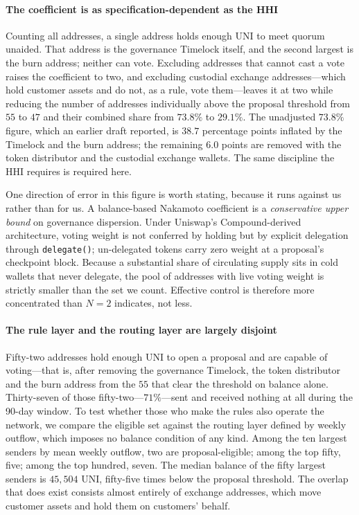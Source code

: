 \documentclass[final,5p,times]{elsarticle}
\begin{document}
\paragraph{The coefficient is as specification-dependent as the HHI}
Counting all addresses, a single address holds enough UNI to meet quorum
unaided. That address is the governance Timelock itself, and the second
largest is the burn address; neither can vote. Excluding addresses that
cannot cast a vote raises the coefficient to two, and excluding custodial
exchange addresses---which hold customer assets and do not, as a rule, vote
them---leaves it at two while reducing the number of addresses individually
above the proposal threshold from $55$ to $47$ and their combined share from
$73.8\%$ to $29.1\%$. The unadjusted $73.8\%$ figure, which an earlier draft
reported, is $38.7$ percentage points inflated by the Timelock and the burn
address; the remaining $6.0$ points are removed with the token distributor
and the custodial exchange wallets. The same discipline the HHI requires is required here.

One direction of error in this figure is worth stating, because it runs
against us rather than for us. A balance-based Nakamoto coefficient is a
\emph{conservative upper bound} on governance dispersion. Under Uniswap's
Compound-derived architecture, voting weight is not conferred by holding but
by explicit delegation through \texttt{delegate()}; un-delegated tokens carry
zero weight at a proposal's checkpoint block. Because a substantial share of
circulating supply sits in cold wallets that never delegate, the pool of
addresses with live voting weight is strictly smaller than the set we count.
Effective control is therefore more concentrated than $N=2$ indicates, not
less.




\paragraph{The rule layer and the routing layer are largely disjoint}
Fifty-two addresses hold enough UNI to open a proposal and are capable of
voting---that is, after removing the governance Timelock, the token
distributor and the burn address from the $55$ that clear the threshold on
balance alone. Thirty-seven of those fifty-two---$71\%$---sent and received
nothing at all during the 90-day window. To test whether those who make the rules also
operate the network, we compare the eligible set against the routing layer
defined by weekly outflow, which imposes no balance condition of any kind.
Among the ten largest senders by mean weekly outflow, two are
proposal-eligible; among the top fifty, five; among the top hundred, seven.
The median balance of the fifty largest senders is $45{,}504$ UNI, fifty-five
times below the proposal threshold. The overlap that does exist consists
almost entirely of exchange addresses, which move customer assets and hold
them on customers' behalf.
\end{document}
